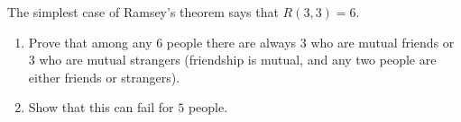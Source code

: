 The simplest case of Ramsey's theorem says that $R(3,3)=6$.
\begin{enumerate}
\item[(a)] Prove that among any $6$ people there are always $3$ who are mutual friends or $3$ who are mutual strangers (friendship is mutual, and any two people are either friends or strangers).
\item[(b)] Show that this can fail for $5$ people.
\end{enumerate}
